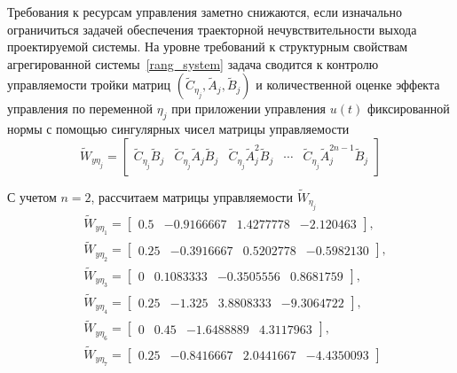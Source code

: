 Требования к ресурсам управления заметно снижаются, если изначально ограничиться задачей обеспечения траекторной нечувствительности выхода проектируемой системы. На уровне требований к структурным свойствам агрегированной системы~\ref{rang_system} задача сводится к контролю управляемости тройки матриц $(\tilde{C}_{\eta_j}, \tilde{A}_{j}, \tilde{B}_{j})$ и количественной оценке эффекта управления по переменной $\eta_j$ при приложении управления $u(t)$ фиксированной нормы с помощью сингулярных чисел матрицы управляемости
\begin{equation}
	\tilde{W}_{y \eta_j} =
	\begin{bmatrix}
		\tilde{C}_{\eta_j} \tilde{B}_{j} &
		\tilde{C}_{\eta_j} \tilde{A}_{j} \tilde{B}_{j} &
		\tilde{C}_{\eta_j} \tilde{A}_{j}^2 \tilde{B}_{j} &		
		\cdots &
		\tilde{C}_{\eta_j} \tilde{A}_{j}^{2n-1} \tilde{B}_{j}
	\end{bmatrix}
\end{equation}

С учетом $n = 2$, рассчитаем матрицы управляемости $\tilde{W}_{\eta_j}$
\begin{align}
	&\tilde{W}_{y \eta_{1}} =
	\begin{bmatrix}
		0.5  & - 0.9166667  &  1.4277778 & - 2.120463   
	\end{bmatrix}, 
	\\
	&\tilde{W}_{y \eta_2} =
	\begin{bmatrix}
		0.25 &  - 0.3916667 &   0.5202778 & - 0.5982130  	
	\end{bmatrix}, 
	\\
	&\tilde{W}_{y \eta_3} =
	\begin{bmatrix}
		0   &   0.1083333 & - 0.3505556 &   0.8681759  
	\end{bmatrix}, 
	\\
	&\tilde{W}_{y \eta_4} =
	\begin{bmatrix}
		0.25 & - 1.325    &    3.8808333 & - 9.3064722  
	\end{bmatrix}, 
	\\
	&\tilde{W}_{y \eta_6} =
	\begin{bmatrix}
		0   &   0.45   &    - 1.6488889  &  4.3117963  
	\end{bmatrix}, 
	\\
	&\tilde{W}_{y \eta_7} =
	\begin{bmatrix}
		0.25 & - 0.8416667 &   2.0441667 & - 4.4350093
	\end{bmatrix}
\end{align}

